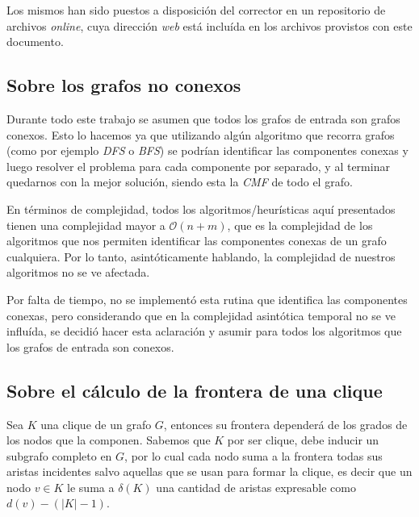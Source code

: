 \par Los mismos han sido puestos a disposici\'on del corrector en un repositorio
    de archivos \emph{online}, cuya direcci\'on \emph{web} est\'a inclu\'ida
    en los archivos provistos con este documento.

{}
\subsection*{Sobre los grafos no conexos}
\par Durante todo este trabajo se asumen que todos los grafos de entrada son
    grafos conexos. Esto lo hacemos ya que utilizando alg\'un algoritmo que recorra
    grafos (como por ejemplo \emph{DFS} o \emph{BFS}) se podr\'ian identificar
    las componentes conexas y luego resolver el problema para cada componente
    por separado, y al terminar quedarnos con la mejor soluci\'on, siendo esta
    la \emph{CMF} de todo el grafo.

\par En t\'erminos de complejidad, todos los algoritmos/heur\'isticas aqu\'i
    presentados tienen una complejidad mayor a $\mathcal O(n+m)$, que es
    la complejidad de los algoritmos que nos permiten identificar las componentes
    conexas de un grafo cualquiera. Por lo tanto, asint\'oticamente hablando,
    la complejidad de nuestros algoritmos no se ve afectada.

\par Por falta de tiempo, no se implement\'o esta rutina que identifica las componentes
    conexas, pero considerando que en la complejidad asint\'otica temporal no se
    ve influ\'ida, se decidi\'o hacer esta aclaraci\'on y asumir para todos los algoritmos que
    los grafos de entrada son conexos.

{}
\subsection*{Sobre el c\'alculo de la frontera de una clique}
\par Sea $K$ una clique de un grafo $G$, entonces su frontera depender\'a de los
    grados de los nodos que la componen. Sabemos que $K$ por ser clique, debe inducir
    un subgrafo completo en $G$, por lo cual cada nodo suma a la frontera
    todas sus aristas incidentes salvo aquellas que se usan para formar la
    clique, es decir que un nodo $v \in K$ le suma a $\delta(K)$ una cantidad
    de aristas expresable como $d(v)-(|K|-1)$.

